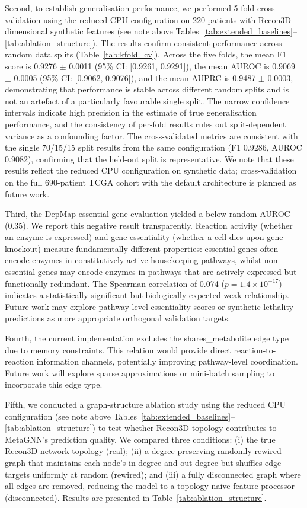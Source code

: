 \documentclass[12pt,a4paper]{article}
\begin{document}
Second, to establish generalisation performance, we performed 5-fold cross-validation using the reduced CPU configuration on 220 patients with Recon3D-dimensional synthetic features (see note above Tables~\ref{tab:extended_baselines}--\ref{tab:ablation_structure}). The results confirm consistent performance across random data splits (Table~\ref{tab:kfold_cv}). Across the five folds, the mean F1 score is 0.9276 $\pm$ 0.0011 (95\% CI: [0.9261, 0.9291]), the mean AUROC is 0.9069 $\pm$ 0.0005 (95\% CI: [0.9062, 0.9076]), and the mean AUPRC is 0.9487 $\pm$ 0.0003, demonstrating that performance is stable across different random splits and is not an artefact of a particularly favourable single split. The narrow confidence intervals indicate high precision in the estimate of true generalisation performance, and the consistency of per-fold results rules out split-dependent variance as a confounding factor. The cross-validated metrics are consistent with the single 70/15/15 split results from the same configuration (F1 0.9286, AUROC 0.9082), confirming that the held-out split is representative. We note that these results reflect the reduced CPU configuration on synthetic data; cross-validation on the full 690-patient TCGA cohort with the default architecture is planned as future work.

Third, the DepMap essential gene evaluation yielded a below-random AUROC (0.35). We report this negative result transparently. Reaction activity (whether an enzyme is expressed) and gene essentiality (whether a cell dies upon gene knockout) measure fundamentally different properties: essential genes often encode enzymes in constitutively active housekeeping pathways, whilst non-essential genes may encode enzymes in pathways that are actively expressed but functionally redundant. The Spearman correlation of 0.074 ($p = 1.4 \times 10^{-17}$) indicates a statistically significant but biologically expected weak relationship. Future work may explore pathway-level essentiality scores or synthetic lethality predictions as more appropriate orthogonal validation targets.

Fourth, the current implementation excludes the shares\_metabolite edge type due to memory constraints. This relation would provide direct reaction-to-reaction information channels, potentially improving pathway-level coordination. Future work will explore sparse approximations or mini-batch sampling to incorporate this edge type.

Fifth, we conducted a graph-structure ablation study using the reduced CPU configuration (see note above Tables~\ref{tab:extended_baselines}--\ref{tab:ablation_structure}) to test whether Recon3D topology contributes to MetaGNN's prediction quality. We compared three conditions: (i) the true Recon3D network topology (real); (ii) a degree-preserving randomly rewired graph that maintains each node's in-degree and out-degree but shuffles edge targets uniformly at random (rewired); and (iii) a fully disconnected graph where all edges are removed, reducing the model to a topology-naive feature processor (disconnected). Results are presented in Table~\ref{tab:ablation_structure}.
\end{document}
